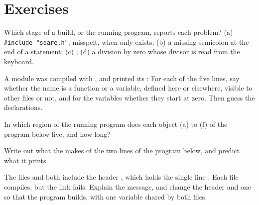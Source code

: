 \section{Exercises}\label{sec:b1:compilation-pipeline:exercises}

\begin{exercise}[$\star$]\label{exo:b1:compilation-pipeline:1}
Which stage of a build, or the running program, reports each problem?
(a) \texttt{\#include "sqare.h"}, misspelt, when only  exists;
(b) a missing semicolon at the end of a statement;
(c) ;
(d) a division by zero whose divisor is read from the keyboard.
\end{exercise}

\begin{exercise}[$\star$]\label{exo:b1:compilation-pipeline:2}
A module  was compiled with , and  printed its :
For each of the five lines, say whether the name is a function or a variable, defined here or elsewhere, visible to
other files or not, and for the variables whether they start at zero. Then guess the declarations.
\end{exercise}

\begin{exercise}[$\star$]\label{exo:b1:compilation-pipeline:3}
In which region of the running program does each object (a) to (f) of the program below live, and how long?
\end{exercise}

\begin{exercise}[$\star$]\label{exo:b1:compilation-pipeline:4}
Write out what the  makes of the two  lines of the program below, and predict what it
prints.
\end{exercise}

\begin{exercise}[$\star\star$]\label{exo:b1:compilation-pipeline:5}
The files  and  both include the header , which holds the single
line . Each file compiles, but the link fails:
Explain the message, and change the header and one  so that the program builds, with one variable
shared by both files.
\end{exercise}

